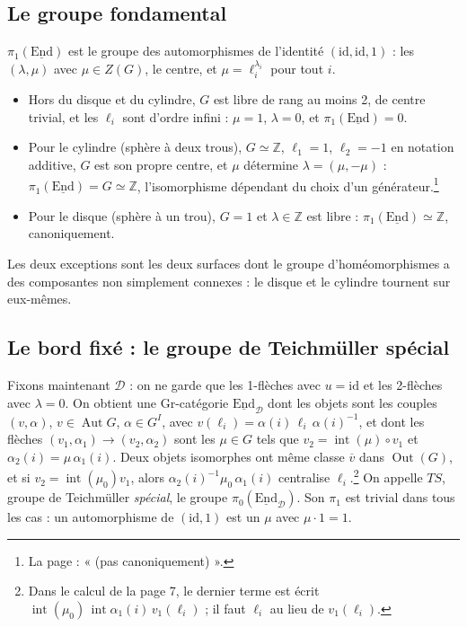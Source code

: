 \documentclass[11pt,a4paper]{article}
\begin{document}
\subsection*{Le groupe fondamental}

$\pi_1(\underline{\mathrm{End}})$ est le groupe des automorphismes de
l'identité $(\mathrm{id}, \mathrm{id}, 1)$ : les $(\lambda, \mu)$ avec
$\mu \in Z(G)$, le centre, et $\mu = \ell_i^{\lambda_i}$ pour tout $i$.

\begin{itemize}
\item Hors du disque et du cylindre, $G$ est libre de rang au moins 2, de
centre trivial, et les $\ell_i$ sont d'ordre infini : $\mu = 1$,
$\lambda = 0$, et $\pi_1(\underline{\mathrm{End}}) = 0$.
\item Pour le cylindre (sphère à deux trous), $G \simeq \mathbb{Z}$,
$\ell_1 = 1$, $\ell_2 = -1$ en notation additive, $G$ est son propre centre,
et $\mu$ détermine $\lambda = (\mu, -\mu)$ : $\pi_1(\underline{\mathrm{End}})
= G \simeq \mathbb{Z}$, l'isomorphisme dépendant du choix d'un
générateur.\footnote{La page : « (pas canoniquement) ».}
\item Pour le disque (sphère à un trou), $G = 1$ et $\lambda \in \mathbb{Z}$
est libre : $\pi_1(\underline{\mathrm{End}}) \simeq \mathbb{Z}$,
canoniquement.
\end{itemize}

Les deux exceptions sont les deux surfaces dont le groupe d'homéomorphismes
a des composantes non simplement connexes : le disque et le cylindre tournent
sur eux-mêmes.

\subsection*{Le bord fixé : le groupe de Teichmüller spécial}

Fixons maintenant $\mathcal{D}$ : on ne garde que les 1-flèches avec
$u = \mathrm{id}$ et les 2-flèches avec $\lambda = 0$. On obtient une
Gr-catégorie $\underline{\mathrm{End}}_{\mathcal{D}}$ dont les objets sont
les couples $(v, \alpha)$, $v \in \operatorname{Aut} G$, $\alpha \in G^I$,
avec $v(\ell_i) = \alpha(i)\, \ell_i\, \alpha(i)^{-1}$, et dont les flèches
$(v_1, \alpha_1) \to (v_2, \alpha_2)$ sont les $\mu \in G$ tels que
$v_2 = \operatorname{int}(\mu) \circ v_1$ et $\alpha_2(i) = \mu\,
\alpha_1(i)$. Deux objets isomorphes ont même classe $\overline{v}$ dans
$\operatorname{Out}(G)$, et si $v_2 = \operatorname{int}(\mu_0) v_1$, alors
$\alpha_2(i)^{-1} \mu_0\, \alpha_1(i)$ centralise $\ell_i$.\footnote{Dans le
calcul de la page 7, le dernier terme est écrit
$\operatorname{int}(\mu_0)\, \operatorname{int} \alpha_1(i)\, v_1(\ell_i)$ ;
il faut $\ell_i$ au lieu de $v_1(\ell_i)$.} On appelle $TS$, groupe de
Teichmüller \emph{spécial}, le groupe $\pi_0(\underline{\mathrm{End}}_{
\mathcal{D}})$. Son $\pi_1$ est trivial dans tous les cas : un automorphisme
de $(\mathrm{id}, 1)$ est un $\mu$ avec $\mu \cdot 1 = 1$.
\end{document}
